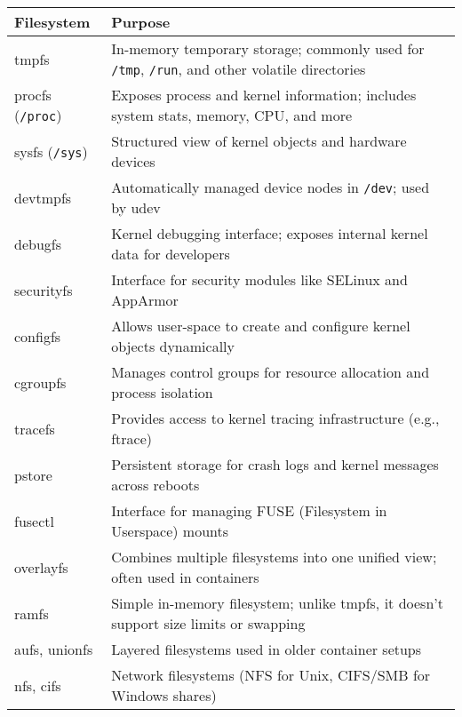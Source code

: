 

\begin{NxLightBox}[title={Pseudo Virtual Filesystems}]
	\begin{tabularx}{\textwidth}{|l|X|}
		\hline
		\textbf{Filesystem} & \textbf{Purpose} \\
		\hline
		tmpfs & In-memory temporary storage; commonly used for \texttt{/tmp}, \texttt{/run}, and other volatile directories \\
		\hline
		procfs (\texttt{/proc}) & Exposes process and kernel information; includes system stats, memory, CPU, and more \\
		\hline
		sysfs (\texttt{/sys}) & Structured view of kernel objects and hardware devices \\
		\hline
		devtmpfs & Automatically managed device nodes in \texttt{/dev}; used by udev \\
		\hline
		debugfs & Kernel debugging interface; exposes internal kernel data for developers \\
		\hline
		securityfs & Interface for security modules like SELinux and AppArmor \\
		\hline
		configfs & Allows user-space to create and configure kernel objects dynamically \\
		\hline
		cgroupfs & Manages control groups for resource allocation and process isolation \\
		\hline
		tracefs & Provides access to kernel tracing infrastructure (e.g., ftrace) \\
		\hline
		pstore & Persistent storage for crash logs and kernel messages across reboots \\
		\hline
		fusectl & Interface for managing FUSE (Filesystem in Userspace) mounts \\
		\hline
		overlayfs & Combines multiple filesystems into one unified view; often used in containers \\
		\hline
		ramfs & Simple in-memory filesystem; unlike tmpfs, it doesn't support size limits or swapping \\
		\hline
		aufs, unionfs & Layered filesystems used in older container setups \\
		\hline
		nfs, cifs & Network filesystems (NFS for Unix, CIFS/SMB for Windows shares) \\
		\hline
	\end{tabularx}
\end{NxLightBox}


